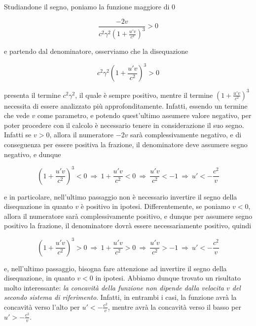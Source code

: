 \documentclass{article}
\begin{document}
Studiandone il segno, poniamo la funzione maggiore di 0

\begin{equation}
    \frac{-2v}{c^2\gamma^2 \left(1 + \frac{u'v}{c^2}\right)^3} > 0
\end{equation}

e partendo dal denominatore,
osserviamo che la disequazione

\begin{equation}
    c^2\gamma^2 \left(1 + \frac{u'v}{c^2}\right)^3 > 0
\end{equation}

presenta il termine \(c^2 \gamma^2\),
il quale è sempre positivo, mentre il termine
\(\left(1 + \frac{u'v}{c^2}\right)^3\)
necessita di essere analizzato più approfonditamente.
Infatti, essendo un termine che vede \(v\)
come parametro, e potendo quest'ultimo assumere valore negativo,
per poter procedere con il calcolo è necessario
tenere in considerazione il suo segno. Infatti se \(v > 0\),
allora il numeratore \(-2v\) sarà complessivamente negativo, e
di conseguenza per essere positiva la frazione, il
denominatore deve assumere segno negativo, e dunque

\begin{equation}
    \left(1 + \frac{u'v}{c^2}\right)^3 < 0\ \Rightarrow\ 1 + \frac{u'v}{c^2} < 0\ \Rightarrow\ \frac{u'v}{c^2} < -1\ \Rightarrow\ u' < - \frac{c^2}{v}
\end{equation}

e in particolare, nell'ultimo passaggio non è
necessario invertire il segno della disequazione in
quanto \(v\) è positivo in ipotesi. Differentemente,
se poniamo \(v < 0\), allora il numeratore sarà
complessivamente positivo, e dunque per assumere
segno positivo la frazione, il denominatore dovrà
essere necessariamente positivo, quindi

\begin{equation}
    \left(1 + \frac{u'v}{c^2}\right)^3 > 0\ \Rightarrow\ 1 + \frac{u'v}{c^2} > 0\ \Rightarrow\ \frac{u'v}{c^2} > -1\ \Rightarrow\ u' < - \frac{c^2}{v}
\end{equation}

e, nell'ultimo passaggio, bisogna fare attenzione
ad invertire il segno della disequazione, in quanto
\(v < 0\) in ipotesi. Abbiamo dunque trovato un risultato
molto interessante: \textit{la concavità della funzione
non dipende dalla velocita \(v\) del secondo sistema di
riferimento}. Infatti, in entrambi i casi, la funzione
avrà la concavità verso l'alto per \(u' < - \frac{c^2}{v}\),
mentre avrà la concavità verso il basso per \(u' > - \frac{c^2}{v}\).
\end{document}
